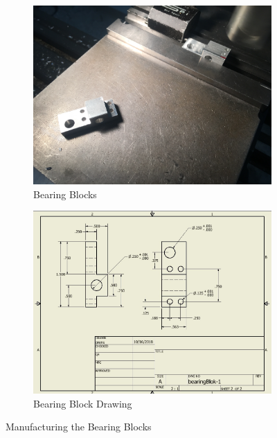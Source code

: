 \documentclass{article}
\begin{document}
\begin{figure}[h!]
\centering
\begin{subfigure}{.45\textwidth}
  \centering
  \includegraphics[width=\textwidth]{09_10-29/images/bearingblock.JPG}
  \caption{Bearing Blocks}
  \label{fig:Bearings}
 \end{subfigure}
\begin{subfigure}{.45\textwidth}
  \centering
  \includegraphics[width=\textwidth]{09_10-29/images/Drawings.jpg}
  \caption{Bearing Block Drawing}
  \label{fig:BearingDrawing}
  \end{subfigure}
  \caption{Manufacturing the Bearing Blocks}
  \end{figure}
  
\end{document}
